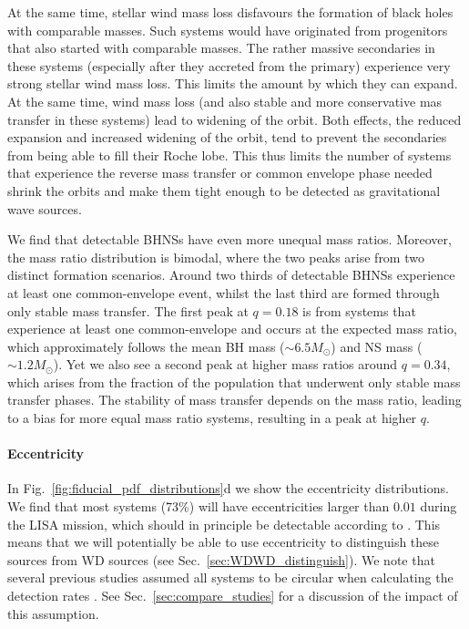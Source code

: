 At the same time, stellar wind mass loss disfavours the formation of black holes with comparable masses. Such systems would have originated from progenitors that also started with comparable masses. The rather massive secondaries in these systems (especially after they accreted from the primary) experience very strong stellar wind mass loss. This limits the amount by which they can expand. At the same time, wind mass loss (and also stable and more conservative mas transfer in these systems) lead to widening of the orbit. Both effects, the reduced expansion and increased widening of the orbit, tend to prevent the secondaries from being able to fill their Roche lobe. This thus limits the number of systems that experience the reverse mass transfer or common envelope phase needed shrink the orbits and make them tight enough to be detected as gravitational wave sources.

We find that detectable BHNSs have even more unequal mass ratios. Moreover, the mass ratio distribution is bimodal, where the two peaks arise from two distinct formation scenarios. Around two thirds of detectable BHNSs experience at least one common-envelope event, whilst the last third are formed through only stable mass transfer. The first peak at $q = 0.18$ is from systems that experience at least one common-envelope and occurs at the expected mass ratio, which approximately follows the mean BH mass ($\sim 6.5 \unit{M_\odot}$) and NS mass ($\sim 1.2 \unit{M_\odot}$). Yet we also see a second peak at higher mass ratios around $q = 0.34$, which arises from the fraction of the population that underwent only stable mass transfer phases. The stability of mass transfer depends on the mass ratio, leading to a bias for more equal mass ratio systems, resulting in a peak at higher $q$.

\paragraph{Eccentricity} In Fig.~\ref{fig:fiducial_pdf_distributions}d we show the eccentricity distributions. We find that most systems (73\%) will have eccentricities larger than $0.01$ during the LISA mission, which should in principle be detectable according to \citet{Nishizawa+2016}. This means that we will potentially be able to use eccentricity to distinguish these sources from WD sources (see Sec.~\ref{sec:WDWD_distinguish}). We note that several previous studies assumed all systems to be circular when calculating the detection rates \citep[e.g.][]{Liu+2014, Lamberts+2018, Sesana+2020}. See Sec.~\ref{sec:compare_studies} for a discussion of the impact of this assumption.

